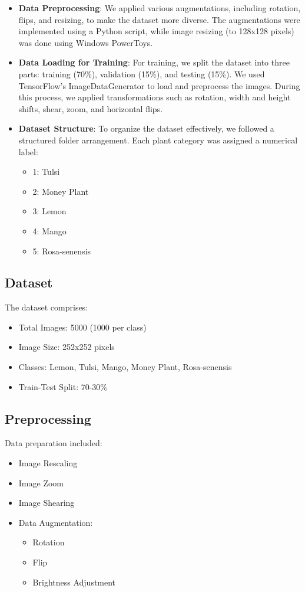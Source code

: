 \documentclass[twocolumn]{article}
\begin{document}
\begin{itemize}\itemsep4pt
    \item \textbf{Data Preprocessing}: We applied various augmentations, including rotation, flips, and resizing, to make the dataset more diverse. The augmentations were implemented using a Python script, while image resizing (to 128x128 pixels) was done using Windows PowerToys.
    
    \item \textbf{Data Loading for Training}: For training, we split the dataset into three parts: training (70\%), validation (15\%), and testing (15\%). We used TensorFlow's ImageDataGenerator to load and preprocess the images. During this process, we applied transformations such as rotation, width and height shifts, shear, zoom, and horizontal flips.
    
    \item \textbf{Dataset Structure}: To organize the dataset effectively, we followed a structured folder arrangement. Each plant category was assigned a numerical label:
    \begin{itemize}\itemsep2pt
        \item 1: Tulsi
        \item 2: Money Plant
        \item 3: Lemon
        \item 4: Mango
        \item 5: Rosa-senensis
    \end{itemize}
\end{itemize}

\subsection{Dataset}
The dataset comprises:
\begin{itemize}\itemsep4pt
    \item Total Images: 5000 (1000 per class)
    \item Image Size: 252x252 pixels
    \item Classes: Lemon, Tulsi, Mango, Money Plant, Rosa-senensis
    \item Train-Test Split: 70-30\%
\end{itemize}

\subsection{Preprocessing}
Data preparation included:
\begin{itemize}\itemsep4pt
    \item Image Rescaling
    \item Image Zoom
    \item Image Shearing
    \item Data Augmentation:
    \begin{itemize}\itemsep2pt
        \item Rotation
        \item Flip
        \item Brightness Adjustment
    \end{itemize}
\end{itemize}
\end{document}
